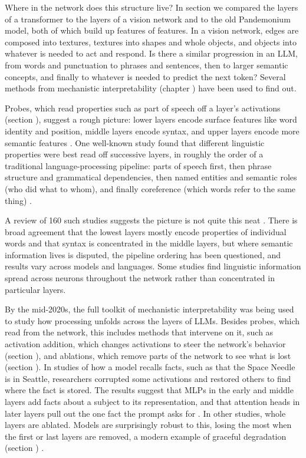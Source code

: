 Where in the network does this structure live? In section
 we compared the layers of a transformer to the
layers of a vision network and to the old Pandemonium model, both of which
build up features of features. In a vision network, edges are composed into
textures, textures into shapes and whole objects, and objects into whatever is
needed to act and respond. Is there a similar progression in an LLM, from words
and punctuation to phrases and sentences, then to larger semantic concepts, and
finally to whatever is needed to predict the next token? Several methods from
mechanistic interpretability
(chapter ) have been used to find out.

Probes, which read properties such as part of speech off a layer's activations
(section ), suggest a rough picture: lower layers encode
surface features like word identity and position, middle layers encode syntax,
and upper layers encode more semantic features \cite{jawahar2019does}. One
well-known study found that different linguistic properties were best read off
successive layers, in roughly the order of a traditional language-processing
pipeline: parts of speech first, then phrase structure and grammatical
dependencies, then named entities and semantic roles (who did what to whom),
and finally coreference (which words refer to the same thing)
\cite{tenney2019bert}.

A review of 160 such studies suggests the picture is not quite this neat
\cite{lopezotal2025linguistic}. There is broad agreement that the lowest layers
mostly encode properties of individual words and that syntax is concentrated in
the middle layers, but where semantic information lives is disputed, the pipeline ordering has been
questioned, and results vary across models and languages. Some studies find
linguistic information spread across neurons throughout the network rather than
concentrated in particular layers.

By the mid-2020s, the full toolkit of mechanistic interpretability was being
used to study how processing unfolds across the layers of LLMs. Besides probes, which read from
the network, this includes methods that intervene on it, such as activation
addition, which changes activations to steer the network's behavior (section
), and ablations, which remove parts of the network
to see what is lost (section ). In studies of how a model
recalls facts, such as that the Space Needle is in Seattle, researchers
corrupted some activations and restored others to find where the fact is
stored. The results suggest that MLPs in the early and middle layers add facts
about a subject to its representation, and that attention heads in later layers
pull out the one fact the prompt asks for \cite{meng2022locating,
geva2023dissecting}. In other studies, whole layers are ablated. Models are
surprisingly robust to this, losing the most when the first or last layers are
removed, a modern example of graceful degradation (section
) \cite{lad2024remarkable}.

